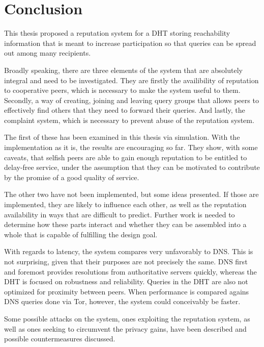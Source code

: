 \chapter{Conclusion}
\label{chap:conclusion}
This thesis proposed a reputation system for a DHT storing reachability
information that is meant to increase participation so that queries can be
spread out among many recipients.

Broadly speaking, there are three elements of the system that are absolutely
integral and need to be investigated. They are firstly the availibility of
reputation to cooperative peers, which is necessary to make the system useful to
them. Secondly, a way of creating, joining and leaving query groups that allows
peers to effectively find others that they need to forward their queries. And
lastly, the complaint system, which is necessary to prevent abuse of the
reputation system.

The first of these has been examined in this thesis via simulation. With the
implementation as it is, the results are encouraging so far. They show, with
some caveats, that selfish peers are able to gain enough reputation to be
entitled to delay-free service, under the assumption that they can be motivated
to contribute by the promise of a good quality of service.

The other two have not been implemented, but some ideas presented. If those are
implemented, they are likely to influence each other, as well as the reputation
availability in ways that are difficult to predict. Further work is needed to
determine how these parts interact and whether they can be assembled into a
whole that is capable of fulfilling the design goal.

With regards to latency, the system compares very unfavorably to DNS. This is
not surprising, given that their purposes are not precisely the same. DNS first
and foremost provides resolutions from authoritative servers quickly, whereas
the DHT is focused on robustness and reliability. Queries in the DHT are also
not optimized for proximity between peers. When performance is compared agains
DNS queries done via Tor, however, the system could conceivably be faster.

Some possible attacks on the system, ones exploiting the reputation system, as
well as ones seeking to circumvent the privacy gains, have been described and
possible countermeasures discussed.
